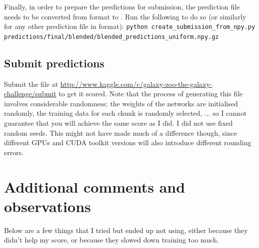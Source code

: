 \documentclass[a4paper,10pt]{article}
\begin{document}
Finally, in order to prepare the predictions for submission, the prediction file needs to be converted from  format to . Run the following to do so (or similarly for any other prediction file in  format): \texttt{python create\_submission\_from\_npy.py} \\ \texttt{predictions/final/blended/blended\_predictions\_uniform.npy.gz}


\subsection{Submit predictions}

Submit the file  at \url{http://www.kaggle.com/c/galaxy-zoo-the-galaxy-challenge/submit} to get it scored. Note that the process of generating this file involves considerable randomness: the weights of the networks are initialised randomly, the training data for each chunk is randomly selected, ... so I cannot guarantee that you will achieve the same score as I did. I did not use fixed random seeds. This might not have made much of a difference though, since different GPUs and CUDA toolkit versions will also introduce different rounding errors.

\section{Additional comments and observations}

Below are a few things that I tried but ended up not using, either because they didn't help my score, or because they slowed down training too much.
\end{document}
